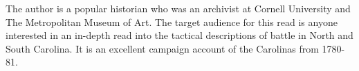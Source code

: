 The author is a popular historian who was an archivist at Cornell University
and The Metropolitan Museum of Art. The target audience for this read is anyone
interested in an in-depth read into the tactical descriptions of battle in
North and South Carolina. It is an excellent campaign account of the Carolinas
from 1780-81.

